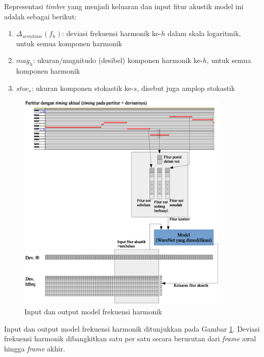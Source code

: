 Representasi \textit{timbre} yang menjadi keluaran dan input fitur akustik model ini adalah sebagai berikut:

\begin{enumerate}
    \item $\Delta_{semitone}(f_h)$: deviasi frekuensi harmonik ke-$h$ dalam skala logaritmik, untuk semua komponen harmonik
    \item $mag_h$: ukuran/magnitudo (desibel) komponen harmonik ke-$h$, untuk semua komponen harmonik
    \item $stoc_s$: ukuran komponen stokastik ke-$s$, disebut juga amplop stokastik
\end{enumerate}

\begin{figure}[htbp]
    \centering
    \includegraphics[width=0.9\textwidth]{resources/hfreq-model-in-out.eps}
    \caption{Input dan output model frekuensi harmonik}\label{fig-hfreq-model-in-out}
\end{figure}

Input dan output model frekuensi harmonik ditunjukkan pada Gambar \ref{fig-hfreq-model-in-out}. Deviasi frekuensi harmonik dibangkitkan satu per satu secara berurutan dari \textit{frame} awal hingga \textit{frame} akhir.

